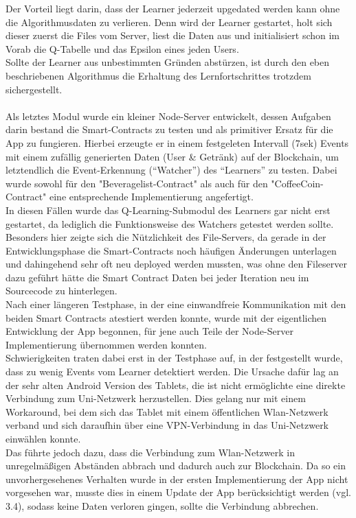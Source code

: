 Der Vorteil liegt darin, dass der Learner jederzeit upgedated werden kann ohne die Algorithmusdaten zu verlieren. Denn wird der Learner gestartet, holt sich dieser zuerst die Files vom Server, liest die Daten aus und initialisiert schon im Vorab die Q-Tabelle und das Epsilon eines jeden Users. \\
Sollte der Learner aus unbestimmten Gründen abstürzen, ist durch den eben beschriebenen Algorithmus die Erhaltung des Lernfortschrittes trotzdem sichergestellt.\\\\
Als letztes Modul wurde ein kleiner Node-Server entwickelt, dessen Aufgaben darin bestand die Smart-Contracts zu testen und als primitiver Ersatz für die App zu fungieren. Hierbei erzeugte er in einem festgeleten Intervall (7sek) Events mit einem zufällig generierten Daten (User \& Getränk) auf der Blockchain, um letztendlich die Event-Erkennung (“Watcher”) des “Learners” zu testen. Dabei wurde sowohl für den "Beveragelist-Contract" als auch für den "CoffeeCoin-Contract" eine entsprechende Implementierung angefertigt.
\\In diesen Fällen wurde das Q-Learning-Submodul des Learners gar nicht erst gestartet, da lediglich die Funktionsweise des Watchers getestet werden sollte.\\
Besonders hier zeigte sich die Nützlichkeit des File-Servers, da gerade in der Entwicklungsphase die Smart-Contracts noch häufigen Änderungen unterlagen und dahingehend sehr oft neu deployed werden mussten, was ohne den Fileserver dazu geführt hätte die Smart Contract Daten bei jeder Iteration neu im Sourcecode zu hinterlegen.\\
Nach einer längeren Testphase, in der eine einwandfreie Kommunikation mit den beiden Smart Contracts atestiert werden konnte, wurde mit der eigentlichen Entwicklung der App begonnen, für jene auch Teile der Node-Server Implementierung übernommen werden konnten.\\
Schwierigkeiten traten dabei erst in der Testphase auf, in der festgestellt wurde, dass zu wenig Events vom Learner detektiert werden. Die Ursache dafür lag an der sehr alten Android Version des Tablets, die ist nicht ermöglichte eine direkte Verbindung zum Uni-Netzwerk herzustellen. Dies gelang nur mit einem Workaround, bei dem sich das Tablet mit einem öffentlichen Wlan-Netzwerk verband und sich daraufhin über eine VPN-Verbindung in das Uni-Netzwerk einwählen konnte. \\
Das führte jedoch dazu, dass die Verbindung zum Wlan-Netzwerk in unregelmäßigen Abständen abbrach und dadurch auch zur Blockchain. Da so ein unvorhergesehenes Verhalten wurde in der ersten Implementierung der App nicht vorgesehen war, musste dies in einem Update der App berücksichtigt werden (vgl. 3.4), sodass keine Daten verloren gingen, sollte die Verbindung abbrechen. \\
